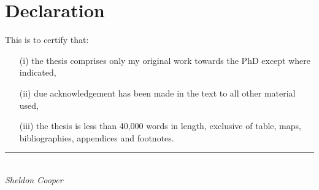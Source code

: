 \chapter*{Declaration} %
This is to certify that:
\begin{itemize}
\item[(i)] the thesis comprises only my original work towards the PhD except where indicated,
\item[(ii)] due acknowledgement has been made in the text to all other material used,
\item[(iii)] the thesis is less than 40,000 words in length, exclusive of table, maps, bibliographies,
appendices and footnotes.
\end{itemize}
\vspace{3cm}
\rule{70mm}{0.1mm}\\
\emph{Sheldon Cooper}